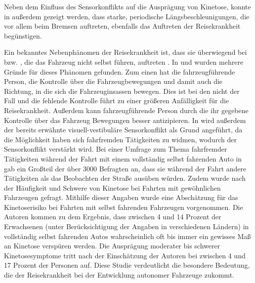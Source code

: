 Neben dem Einfluss des Sensorkonflikts auf die Ausprägung von Kinetose, konnte in \cite{Vogel.1982} außerdem gezeigt werden, dass starke, periodische Längsbeschleunigungen, die vor allem beim Bremsen auftreten, ebenfalls das Auftreten der Reisekrankheit begünstigen. 

Ein bekanntes Nebenphänomen der Reisekrankheit ist, dass sie überwiegend bei  bzw. , die das Fahrzeug nicht selbst führen, auftreten \cite{Reason.1975}. In \cite{Sivak.2015} und \cite{Rolnick.1991} wurden mehrere Gründe für dieses Phänomen gefunden. Zum einen hat die fahrzeugführende Person, die Kontrolle über die Fahrzeugbewegungen und damit auch die Richtung, in die sich die Fahrzeuginsassen bewegen. Dies ist bei den  nicht der Fall und die fehlende Kontrolle führt zu einer größeren Anfälligkeit für die Reisekrankheit. Außerdem kann fahrzeugführende Person durch die ihr gegebene Kontrolle über das Fahrzeug Bewegungen besser antizipieren. In \cite{Sivak.2015} wird außerdem der bereits erwähnte visuell-vestibuläre Sensorkonflikt als Grund angeführt, da  die Möglichkeit haben sich fahrfremden Tätigkeiten zu widmen, wodurch der Sensorkonflikt verstärkt wird. Bei einer Umfrage zum Thema fahrfremder Tätigkeiten während der Fahrt mit einem vollständig selbst fahrenden Auto in \cite{Sivak.2015} gab ein Großteil der über 3000 Befragten an, dass sie während der Fahrt andere Tätigkeiten als das Beobachten der Straße ausüben würden. Zudem wurde nach der Häufigkeit und Schwere von Kinetose bei Fahrten mit gewöhnlichen Fahrzeugen gefragt. Mithilfe dieser Angaben wurde eine Abschätzung für das Kinetoserisiko bei Fahrten mit selbst fahrenden Fahrzeugen vorgenommen. Die Autoren kommen zu dem Ergebnis, dass zwischen 4 und 14 Prozent der Erwachsenen (unter Berücksichtigung der Angaben in verschiedenen Ländern) in vollständig selbst fahrenden Autos wahrscheinlich oft bis immer ein gewisses Maß an Kinetose verspüren werden. Die Ausprägung moderater bis schwerer Kinetosesymptome tritt nach der Einschätzung der Autoren bei zwischen 4 und 17 Prozent der Personen auf. Diese Studie verdeutlicht die besondere Bedeutung, die der Reisekrankheit bei der Entwicklung autonomer Fahrzeuge zukommt. 

